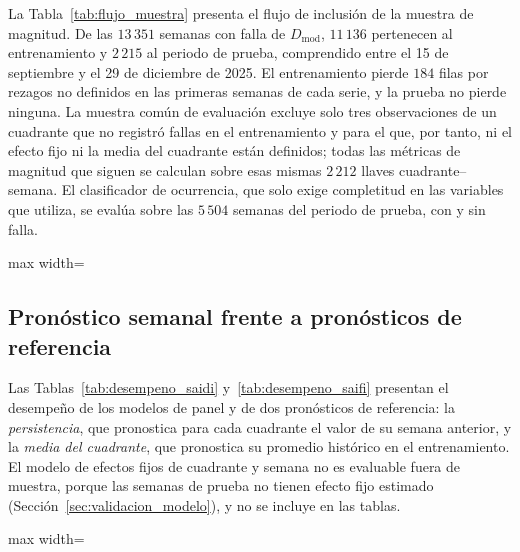 La Tabla~\ref{tab:flujo_muestra} presenta el flujo de inclusión de la muestra de magnitud. De las $13\,351$ semanas con falla de $D_{\mathrm{mod}}$, $11\,136$ pertenecen al entrenamiento y $2\,215$ al periodo de prueba, comprendido entre el 15 de septiembre y el 29 de diciembre de 2025. El entrenamiento pierde $184$ filas por rezagos no definidos en las primeras semanas de cada serie, y la prueba no pierde ninguna. La muestra común de evaluación excluye solo tres observaciones de un cuadrante que no registró fallas en el entrenamiento y para el que, por tanto, ni el efecto fijo ni la media del cuadrante están definidos; todas las métricas de magnitud que siguen se calculan sobre esas mismas $2\,212$ llaves cuadrante--semana. El clasificador de ocurrencia, que solo exige completitud en las variables que utiliza, se evalúa sobre las $5\,504$ semanas del periodo de prueba, con y sin falla.

\begin{table}[!htbp]
\centering
\small
\caption{Flujo de inclusión de la muestra de magnitud (semanas con falla)}
\label{tab:flujo_muestra}
\begin{adjustbox}{max width=\linewidth}

\end{adjustbox}
\end{table}

\subsection{Pronóstico semanal frente a pronósticos de referencia}
\label{sec:resultados_pronostico}

Las Tablas~\ref{tab:desempeno_saidi} y~\ref{tab:desempeno_saifi} presentan el desempeño de los modelos de panel y de dos pronósticos de referencia: la \textit{persistencia}, que pronostica para cada cuadrante el valor de su semana anterior, y la \textit{media del cuadrante}, que pronostica su promedio histórico en el entrenamiento. El modelo de efectos fijos de cuadrante y semana no es evaluable fuera de muestra, porque las semanas de prueba no tienen efecto fijo estimado (Sección~\ref{sec:validacion_modelo}), y no se incluye en las tablas.

\begin{table}[!htbp]
\centering
\small
\caption{Desempeño en el conjunto de prueba para SAIDI (escala $\log(1+y)$; muestra común, $N=2\,212$)}
\label{tab:desempeno_saidi}
\begin{adjustbox}{max width=\linewidth}

\end{adjustbox}
\end{table}


